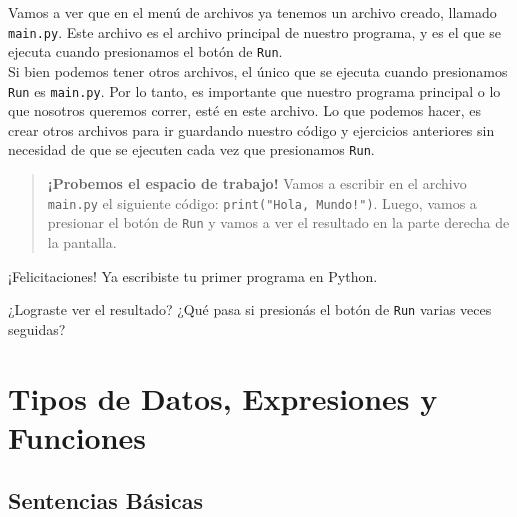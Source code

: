 \documentclass[
  letterpaper,
  DIV=11,
  numbers=noendperiod]{scrreprt}
\begin{document}
Vamos a ver que en el menú de archivos ya tenemos un archivo creado,
llamado \texttt{main.py}. Este archivo es el archivo principal de
nuestro programa, y es el que se ejecuta cuando presionamos el botón de
\texttt{Run}.\\
Si bien podemos tener otros archivos, el único que se ejecuta cuando
presionamos \texttt{Run} es \texttt{main.py}. Por lo tanto, es
importante que nuestro programa principal o lo que nosotros queremos
correr, esté en este archivo. Lo que podemos hacer, es crear otros
archivos para ir guardando nuestro código y ejercicios anteriores sin
necesidad de que se ejecuten cada vez que presionamos \texttt{Run}.

\begin{quote}
\textbf{¡Probemos el espacio de trabajo!} Vamos a escribir en el archivo
\texttt{main.py} el siguiente código: \texttt{print("Hola,\ Mundo!")}.
Luego, vamos a presionar el botón de \texttt{Run} y vamos a ver el
resultado en la parte derecha de la pantalla.
\end{quote}

¡Felicitaciones! Ya escribiste tu primer programa en Python.

\begin{tcolorbox}[enhanced jigsaw, colframe=quarto-callout-note-color-frame, leftrule=.75mm, titlerule=0mm, left=2mm, bottomtitle=1mm, arc=.35mm, opacitybacktitle=0.6, toptitle=1mm, colbacktitle=quarto-callout-note-color!10!white, opacityback=0, breakable, title=\textcolor{quarto-callout-note-color}{\faInfo}\hspace{0.5em}{}, toprule=.15mm, rightrule=.15mm, colback=white, coltitle=black, bottomrule=.15mm]

¿Lograste ver el resultado? ¿Qué pasa si presionás el botón de
\texttt{Run} varias veces seguidas?\\

\end{tcolorbox}


\chapter{Tipos de Datos, Expresiones y
Funciones}\label{tipos-de-datos-expresiones-y-funciones}

\section{Sentencias Básicas}\label{sentencias-buxe1sicas}
\end{document}
